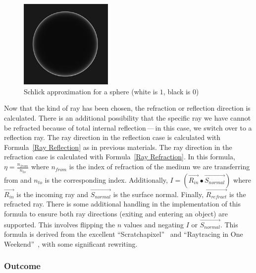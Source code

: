 \vspace{0.3em}
\begin{figure}[htb]
  \centering
  \includegraphics[width=0.4\textwidth]{resources/fresnel}
  \caption{Schlick approximation for a sphere (white is $1$, black is $0$)~\cite{learnopengltheory}}
\label{fig:rayterm-cpu_fresnel}
\end{figure}

Now that the kind of ray has been chosen, the refraction or reflection direction is calculated.
There is an additional possibility that the specific ray we have cannot be refracted because of total internal reflection\,---\,in this case, we switch over to a reflection ray.
The ray direction in the reflection case is calculated with Formula~\ref{Ray Reflection} as in previous materials.
The ray direction in the refraction case is calculated with Formula~\ref{Ray Refraction}.
In this formula, $\eta = \frac{n_{from}}{n_{to}}$ where $n_{from}$ is the index of refraction of the medium we are transferring from and $n_{to}$ is the corresponding index.
Additionally, $I = (\vec{R_{in}} \bullet \vec{S_{normal}})$ where $\vec{R_{in}}$ is the incoming ray and $\vec{S_{normal}}$ is the surface normal.
Finally, $\vec{R_{refract}}$ is the refracted ray.
There is some additional handling in the implementation of this formula to ensure both ray directions (exiting and entering an object) are supported.
This involves flipping the $n$ values and negating $I$ or $\vec{S_{normal}}$.
This formula is derived from the excellent ``Scratchapixel''~\cite{prunier2017shading} and ``Raytracing in One Weekend''~\cite{shirley2016ray}, with some significant rewriting.


\subsubsection{Outcome}
\label{ch:methods:renderer:sequential:outcome}

